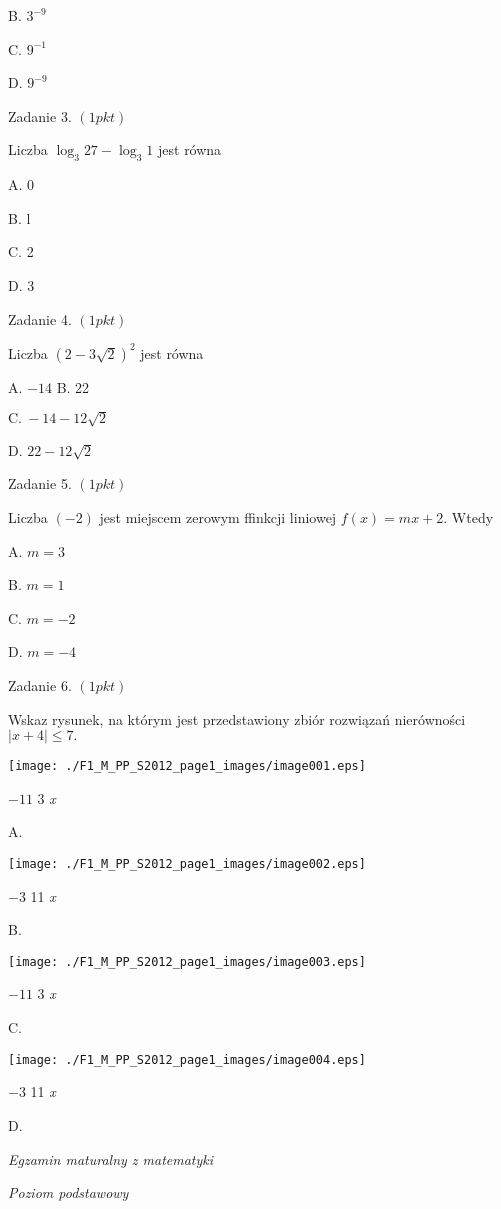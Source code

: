 \documentclass[a4paper,12pt]{article}
\begin{document}
B. $3^{-9}$

C. $9^{-1}$

D. $9^{-9}$

Zadanie 3. $(1pkt)$

Liczba $\log_{3}27-\log_{3}1$ jest równa

A. 0

B. l

C. 2

D. 3

Zadanie 4. $(1pkt)$

Liczba $(2-3\sqrt{2})^{2}$ jest równa

A. $-14$ B. 22

$\mathrm{C}.\ -14-12\sqrt{2}$

D. $22-12\sqrt{2}$

Zadanie 5. $(1pkt)$

Liczba $(-2)$ jest miejscem zerowym ffinkcji liniowej $f(x)=mx+2$. Wtedy

A. $m=3$

B. $m=1$

C. $m=-2$

D. $m=-4$

Zadanie 6. $(1pkt)$

Wskaz rysunek, na którym jest przedstawiony zbiór rozwiązań nierówności $|x+4|\leq 7.$
\begin{center}
\texttt{[image: ./F1\_M\_PP\_S2012\_page1\_images/image001.eps]}
\end{center}
$-11$  3  {\it x}

A.
\begin{center}
\texttt{[image: ./F1\_M\_PP\_S2012\_page1\_images/image002.eps]}
\end{center}
$-3$  11  {\it x}

B.
\begin{center}
\texttt{[image: ./F1\_M\_PP\_S2012\_page1\_images/image003.eps]}
\end{center}
$-11$  3  {\it x}

C.
\begin{center}
\texttt{[image: ./F1\_M\_PP\_S2012\_page1\_images/image004.eps]}
\end{center}
$-3$  11  {\it x}

D.





{\it Egzamin maturalny z matematyki}

{\it Poziom podstawowy}
\end{document}
